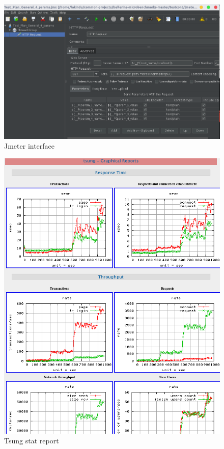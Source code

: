 \begin{figure}[htbp]
  \begin{center}
    \includegraphics[scale=0.3]{figures/jmeter_sc.png}
    \end{center}
  \caption{Jmeter interface}
  \label{jmeter_ui}
\end{figure}


\begin{figure}[htbp]
	\begin{center}
		\includegraphics[scale=0.4]{figures/tsung-graph.png}
	\end{center}
	\caption{Tsung stat report}
	\label{tsung-graph}
\end{figure}


